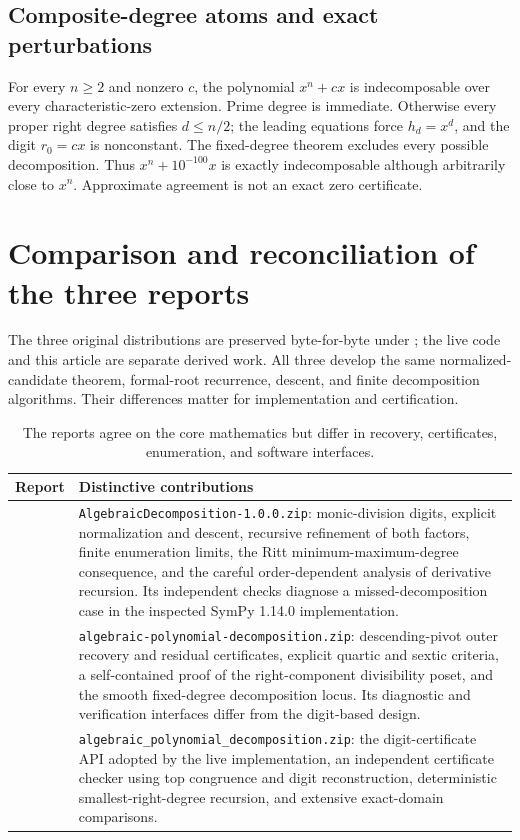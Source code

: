 \documentclass[11pt,a4paper]{article}
\numberwithin{equation}{section}
\theoremstyle{definition}
\theoremstyle{remark}
\newcommand{\code}[1]{\texttt{#1}}
\begin{document}
\subsection{Composite-degree atoms and exact perturbations}

For every \(n\ge2\) and nonzero \(c\), the polynomial \(x^n+cx\) is
indecomposable over every characteristic-zero extension.  Prime degree is
immediate.  Otherwise every proper right degree satisfies \(d\le n/2\);
the leading equations force \(h_d=x^d\), and the digit \(r_0=cx\) is
nonconstant.  The fixed-degree theorem excludes every possible decomposition.
Thus \(x^n+10^{-100}x\) is exactly indecomposable although arbitrarily close
to \(x^n\).  Approximate agreement is not an exact zero certificate.

\section{Comparison and reconciliation of the three reports}\label{sec:reports}

The three original distributions are preserved byte-for-byte under
; the live code and this article are
separate derived work.  All three develop the same normalized-candidate
theorem, formal-root recurrence, descent, and finite decomposition algorithms.
Their differences matter for implementation and certification.

\begin{table}[htbp]
\centering\small
\begin{tabularx}{\textwidth}{@{}lX@{}}
\toprule
Report & Distinctive contributions\\
\midrule
\cite{r1} & \code{AlgebraicDecomposition-1.0.0.zip}: monic-division digits,
explicit normalization and descent, recursive refinement of both factors,
finite enumeration limits, the Ritt minimum-maximum-degree consequence,
and the careful order-dependent analysis of derivative recursion.
Its independent checks diagnose a missed-decomposition case in the
inspected SymPy 1.14.0 implementation.\\
\cite{r2} & \code{algebraic-polynomial-decomposition.zip}: descending-pivot
outer recovery and residual certificates, explicit quartic and sextic
criteria, a self-contained proof of the right-component divisibility
poset, and the smooth fixed-degree decomposition locus.  Its diagnostic
and verification interfaces differ from the digit-based design.\\
\cite{r3} & \code{algebraic\_polynomial\_decomposition.zip}: the digit-certificate
API adopted by the live implementation, an independent certificate checker
using top congruence and digit reconstruction, deterministic
smallest-right-degree recursion, and extensive exact-domain comparisons.\\
\bottomrule
\end{tabularx}
\caption{The reports agree on the core mathematics but differ in recovery,
certificates, enumeration, and software interfaces.}\label{tab:reports}
\end{table}
\end{document}
